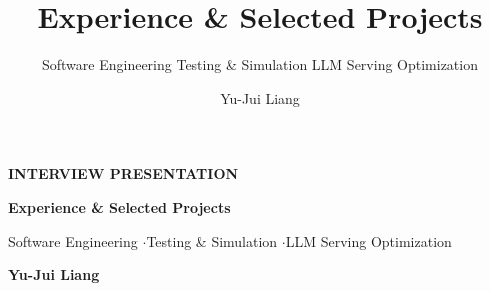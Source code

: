 \documentclass[aspectratio=169,10pt]{beamer}
\title[Interview Presentation]{Experience \& Selected Projects}
\subtitle{Software Engineering \textperiodcentered{} Testing \& Simulation \textperiodcentered{} LLM Serving Optimization}
\author{Yu-Jui Liang}
\institute{National Taiwan University}
\date{}
\begin{document}
{
\begin{frame}[plain]
  \vspace*{0.82cm}
  {\normalsize\bfseries\color{Accent}INTERVIEW PRESENTATION}\par
  \vspace{0.48cm}
  {\raggedright\fontsize{20}{24}\selectfont\bfseries\color{Ink}
    Experience \& Selected Projects\par}
  \vspace{0.34cm}
    {\color{Muted}\fontsize{11}{14}\selectfont Software Engineering \enspace$\cdot$\enspace Testing \& Simulation \enspace$\cdot$\enspace LLM Serving Optimization\par}
  \vspace{0.72cm}
  {\fontsize{18}{22}\selectfont\bfseries Yu-Jui Liang}\par
  \vfill
\end{frame}}
\end{document}
